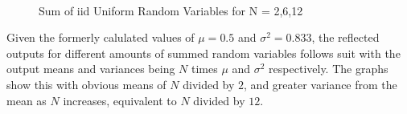 \documentclass[a4paper, 11pt]{article}
\begin{document}
\begin{figure}
    \centering
     \\
\caption{\label{fig:UniformSubFig}Sum of iid Uniform Random Variables for N = 2,6,12}
\end{figure}

\noindent
Given the formerly calulated values of \(\mu = 0.5\) and \(\sigma^2 = 0.833\), the reflected outputs for different amounts of summed random variables follows suit with the output means and variances being \(N\) times \(\mu\) and \(\sigma^2\) respectively.
The graphs show this with obvious means of \(N\) divided by \(2\), and greater variance from the mean as \(N\) increases, equivalent to \(N\) divided by \(12\).
\end{document}
